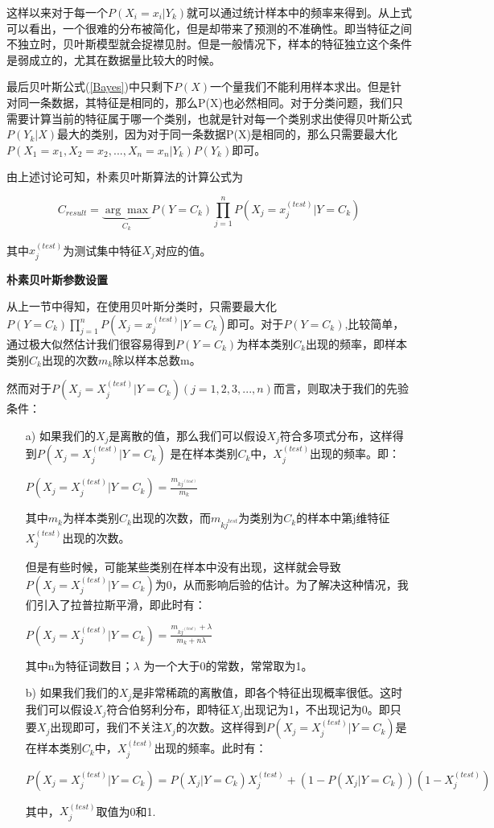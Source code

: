 \documentclass[a4paper,11pt,twoside,openany]{article}
\begin{document}
\begin{CJK*}{UTF8}{gbsn}
这样以来对于每一个$P(X_i = x_i|Y_k)$就可以通过统计样本中的频率来得到。从上式可以看出，一个很难的分布被简化，但是却带来了预测的不准确性。即当特征之间不独立时，贝叶斯模型就会捉襟见肘。但是一般情况下，样本的特征独立这个条件是弱成立的，尤其在数据量比较大的时候。

最后贝叶斯公式(\ref{Bayes})中只剩下$P(X)$一个量我们不能利用样本求出。但是针对同一条数据，其特征是相同的，那么P(X)也必然相同。对于分类问题，我们只需要计算当前的特征属于哪一个类别，也就是针对每一个类别求出使得贝叶斯公式$P(Y_k|X)$最大的类别，因为对于同一条数据P(X)是相同的，那么只需要最大化$P(X_1=x_1,X_2=x_2,...,X_n=x_n|Y_k)P(Y_k)$即可。

由上述讨论可知，朴素贝叶斯算法的计算公式为

\begin{equation}\label{naive bayes}
C_{result} = \underbrace{\arg\max}_{C_k}P(Y=C_k)\prod_{j=1}^nP(X_j=x_j^{(test)}|Y = C_k)
\end{equation}

其中$x_j^{(test)}$为测试集中特征$X_j$对应的值。

\textbf{朴素贝叶斯参数设置}

从上一节中得知，在使用贝叶斯分类时，只需要最大化$P(Y=C_k)\prod_{j=1}^nP(X_j=x_j^{(test)}|Y = C_k)$即可。对于$P(Y=C_k)$,比较简单，通过极大似然估计我们很容易得到$P(Y=C_k)$为样本类别$C_k$出现的频率，即样本类别$C_k$出现的次数$m_k$除以样本总数m。

然而对于$P(X_j = X_j^{(test)}|Y = C_k)(j=1,2,3,...,n)$而言，则取决于我们的先验条件：
\begin{enumerate}
\item[a)]
	 如果我们的$X_j$是离散的值，那么我们可以假设$X_j$符合多项式分布，这样得到$P(X_j=X^{(test)}_j|Y=C_k)$ 是在样本类别$C_k$中，$X^{(test)}_j$出现的频率。即：
	 \begin{center}
	 $P(X_j = X_j^{(test)}|Y=C_k)=\frac{m_{kj^{(test)}}}{m_k}$
	 \end{center}
	 其中$m_k$为样本类别$C_k$出现的次数，而$m_{kj^{test}}$为类别为$C_k$的样本中第j维特征$X^{(test)}_j$出现的次数。
	 
	 但是有些时候，可能某些类别在样本中没有出现，这样就会导致$P(X_j=X^{(test)}_j|Y=C_k)$为0，从而影响后验的估计。为了解决这种情况，我们引入了拉普拉斯平滑，即此时有：
	 \begin{center}
	 	$P(X_j = X_j^{(test)}|Y=C_k)=\frac{m_{kj^{(test)}}+\lambda }{m_k + n\lambda}$
	 \end{center}
	 
	 其中n为特征词数目；$\lambda$ 为一个大于0的常数，常常取为1。
\item[b)]
	如果我们我们的$X_j$是非常稀疏的离散值，即各个特征出现概率很低。这时我们可以假设$X_j$符合伯努利分布，即特征$X_j$出现记为1，不出现记为0。即只要$X_j$出现即可，我们不关注$X_j$的次数。这样得到$P(X_j=X^{(test)}_j|Y=C_k)$是在样本类别$C_k$中，$X^{(test)}_j$出现的频率。此时有：
		\begin{center}
			$P(X_j = X^{(test)}_j|Y =C_k) = P(X_j|Y=C_k)X_j^{(test)} + (1-P(X_j|Y=C_k))(1-X_j^{(test)})$
		\end{center}
	其中，$X_j^{(test)}$取值为0和1.
\end{enumerate}


\end{CJK*}
\end{document}

